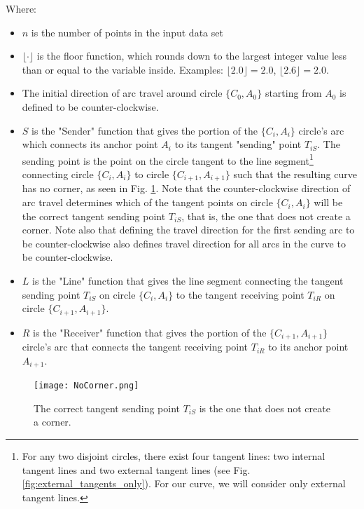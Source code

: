 \documentclass{article}
\begin{document}
Where:
\begin{itemize}
    \item $n$ is the number of points in the input data set
    \item $\lfloor \cdot \rfloor$ is the floor function, which rounds down to the largest integer value less than or equal to the variable inside. Examples: $\lfloor 2.0 \rfloor = 2.0$, $\lfloor 2.6 \rfloor = 2.0$.
    \item The initial direction of arc travel around circle $\{C_0, A_0\}$ starting from $A_0$ is defined to be counter-clockwise.
    \item $S$ is the "Sender" function that gives the portion of the $\{C_i, A_i\}$ circle's arc which connects its anchor point $A_i$ to its tangent "sending" point $T_{iS}$. The sending point is the point on the circle tangent to the line segment\footnote{For any two disjoint circles, there exist four tangent lines: two internal tangent lines and two external tangent lines (see Fig. \ref{fig:external_tangents_only}). For our curve, we will consider only external tangent lines.} connecting circle $\{C_i, A_i\}$ to circle $\{C_{i+1}, A_{i+1}\}$ such that the resulting curve has no corner, as seen in Fig. \ref{fig:does_not_create_a_corner}.
    Note that the counter-clockwise direction of arc travel determines which of the tangent points on circle $\{C_i, A_i\}$ will be the correct tangent sending point $T_{iS}$, that is, the one that does not create a corner. Note also that defining the travel direction for the first sending arc to be counter-clockwise also defines travel direction for all arcs in the curve to be counter-clockwise.
    \item $L$ is the "Line" function that gives the line segment connecting the tangent sending point $T_{iS}$ on circle $\{C_i, A_i\}$ to the tangent receiving point $T_{iR}$ on circle $\{C_{i+1}, A_{i+1}\}$.
    \item $R$ is the "Receiver" function that gives the portion of the $\{C_{i+1}, A_{i+1}\}$ circle's arc that connects the tangent receiving point $T_{iR}$ to its anchor point $A_{i+1}$.
\end{itemize}

\begin{figure}
    \centering
    \texttt{[image: NoCorner.png]}
    \caption{The correct tangent sending point $T_{iS}$ is the one that does not create a corner.}
    \label{fig:does_not_create_a_corner}
\end{figure}
\end{document}
